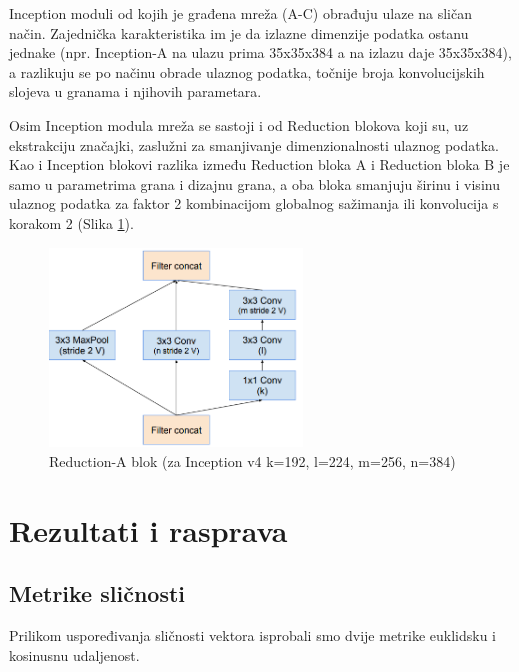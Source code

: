 \documentclass[times, utf8, proizvoljni, numeric]{fer}
\begin{document}
Inception moduli od kojih je građena mreža (A-C) obrađuju ulaze na sličan način. Zajednička karakteristika im je da izlazne dimenzije podatka ostanu jednake (npr. Inception-A na ulazu prima 35x35x384 a na izlazu daje 35x35x384), a razlikuju se po načinu obrade ulaznog podatka, točnije broja konvolucijskih slojeva u granama i njihovih parametara.

Osim Inception modula mreža se sastoji i od Reduction blokova koji su, uz ekstrakciju značajki, zaslužni za smanjivanje dimenzionalnosti ulaznog podatka. Kao i Inception blokovi razlika između Reduction bloka A i Reduction bloka B je samo u parametrima grana i dizajnu grana, a oba bloka smanjuju širinu i visinu ulaznog podatka za faktor 2 kombinacijom globalnog sažimanja ili konvolucija s korakom 2 (Slika \ref{fg:inception_reduction_a}).

\begin{figure}[!ht]
	\begin{center}
		\captionsetup{justification=centering}
		\includegraphics[width=0.6\textwidth]{./imgs/inception_reduction_a.png}
		\caption{Reduction-A blok (za Inception v4 k=192, l=224, m=256, n=384) \cite{Inceptionv4}}
		\label{fg:inception_reduction_a}
	\end{center}
\end{figure}
\chapter{Rezultati i rasprava}

\section{Metrike sličnosti}

Prilikom uspoređivanja sličnosti vektora isprobali smo dvije metrike  euklidsku i kosinusnu udaljenost. 
\end{document}
